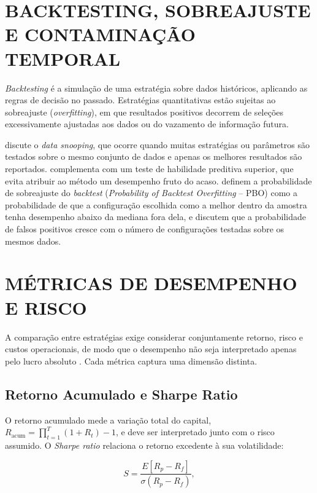 \section{BACKTESTING, SOBREAJUSTE E CONTAMINAÇÃO TEMPORAL}

\textit{Backtesting} é a simulação de uma estratégia sobre dados históricos, aplicando as regras de decisão no passado. Estratégias quantitativas estão sujeitas ao sobreajuste (\textit{overfitting}), em que resultados positivos decorrem de seleções excessivamente ajustadas aos dados ou do vazamento de informação futura.

\citet{White2000} discute o \textit{data snooping}, que ocorre quando muitas estratégias ou parâmetros são testados sobre o mesmo conjunto de dados e apenas os melhores resultados são reportados. \citet{Hansen2005} complementa com um teste de habilidade preditiva superior, que evita atribuir ao método um desempenho fruto do acaso. \citet{Bailey2017} definem a probabilidade de sobreajuste do \textit{backtest} (\textit{Probability of Backtest Overfitting} -- PBO) como a probabilidade de que a configuração escolhida como a melhor dentro da amostra tenha desempenho abaixo da mediana fora dela, e discutem que a probabilidade de falsos positivos cresce com o número de configurações testadas sobre os mesmos dados.

\section{MÉTRICAS DE DESEMPENHO E RISCO}

A comparação entre estratégias exige considerar conjuntamente retorno, risco e custos operacionais, de modo que o desempenho não seja interpretado apenas pelo lucro absoluto \citep{LopezDePrado2018}. Cada métrica captura uma dimensão distinta.

\subsection{Retorno Acumulado e Sharpe Ratio}

O retorno acumulado mede a variação total do capital, $R_{\text{acum}} = \prod_{t=1}^{T} (1 + R_t) - 1$, e deve ser interpretado junto com o risco assumido. O \textit{Sharpe ratio} \citep{Sharpe1994, Lo2002} relaciona o retorno excedente à sua volatilidade:

\begin{equation}
S = \frac{E[R_p - R_f]}{\sigma(R_p - R_f)},
\end{equation}


